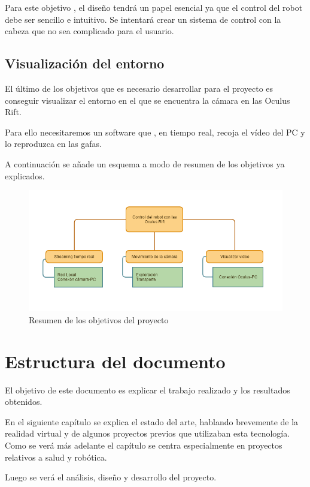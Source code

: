 \documentclass[twoside, 12pt]{epstfg}
\begin{document}
Para este objetivo , el diseño tendrá un papel esencial ya que el control del robot debe ser sencillo e intuitivo. Se intentará crear un sistema de control con la cabeza que no sea complicado para el usuario.

\subsection{Visualización del entorno}
El último de los objetivos que es necesario desarrollar para el proyecto es conseguir visualizar el entorno en el que se encuentra la cámara en las Oculus Rift.

Para ello necesitaremos un software que , en tiempo real, recoja el vídeo del PC y lo reproduzca en las gafas. 


A continuación se añade un esquema a modo de resumen de los objetivos ya explicados.

\begin{figure}[h!]
	\centerline{
		\mbox{\includegraphics[width=7.00in]{images/objetivos.png}}
	}
	\caption{Resumen de los objetivos del proyecto}
\end{figure}

\newpage
\section{Estructura del documento}


El objetivo de este documento es explicar el trabajo realizado y los resultados obtenidos.

En el siguiente capítulo se explica el estado del arte, hablando brevemente de la realidad virtual y de algunos proyectos previos que utilizaban esta tecnología. Como se verá más adelante el capítulo se centra especialmente en proyectos relativos a salud y robótica.

Luego se verá el análisis, diseño y desarrollo del proyecto.
\end{document}
